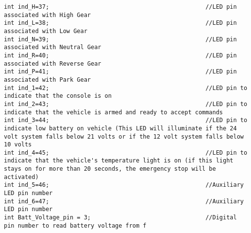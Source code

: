 \begin{lstlisting}[breaklines=true,basicstyle=\tiny]
int ind_H=37;                                             //LED pin associated with High Gear
int ind_L=38;                                             //LED pin associated with Low Gear
int ind_N=39;                                             //LED pin associated with Neutral Gear
int ind_R=40;                                             //LED pin associated with Reverse Gear
int ind_P=41;                                             //LED pin associated with Park Gear
int ind_1=42;                                             //LED pin to indicate that the console is on
int ind_2=43;                                             //LED pin to indicate that the vehicle is armed and ready to accept commands
int ind_3=44;                                             //LED pin to indicate low battery on vehicle (This LED will illuminate if the 24 volt system falls below 21 volts or if the 12 volt system falls below 10 volts
int ind_4=45;                                             //LED pin to indicate that the vehicle's temperature light is on (if this light stays on for more than 20 seconds, the emergency stop will be activated)
int ind_5=46;                                             //Auxiliary LED pin number
int ind_6=47;                                             //Auxiliary LED pin number
int Batt_Voltage_pin = 3;                                 //Digital pin number to read battery voltage from f

\end{lstlisting}

